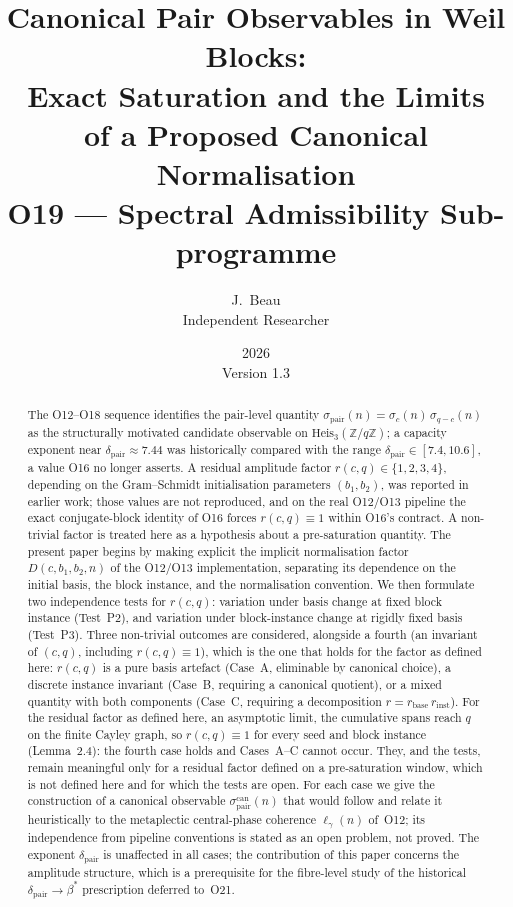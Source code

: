\documentclass[11pt,a4paper]{article}
\title{Canonical Pair Observables in Weil Blocks:\\
Exact Saturation and the Limits\\
of a Proposed Canonical Normalisation\\[6pt]
{\large O19 --- Spectral Admissibility Sub-programme}}
\author{J.~Beau\\[4pt]
\small Independent Researcher}
\date{2026\\Version 1.3}
\theoremstyle{remark}
\newcommand{\bstar}{\beta^{*}}
\newcommand{\dpair}{\delta_{\mathrm{pair}}}
\newcommand{\sigmapair}{\sigma_{\mathrm{pair}}}
\newcommand{\sigmacan}{\sigma_{\mathrm{pair}}^{\mathrm{can}}}
\newcommand{\rcq}{r(c,q)}
\newcommand{\Heis}{\mathrm{Heis}_{3}(\mathbb{Z}/q\mathbb{Z})}
\newcommand{\ellgam}{\ell_{\gamma}}
\begin{document}
  \maketitle

  \begin{abstract}
    The O12--O18 sequence identifies the pair-level quantity
    $\sigmapair(n) = \sigma_{c}(n)\,\sigma_{q-c}(n)$ as the structurally motivated
    candidate observable on $\Heis$; a capacity exponent near
    $\dpair \approx 7.44$ was historically compared with the range
    $\dpair \in [7.4, 10.6]$, a value O16 no longer asserts.
    A residual amplitude factor $\rcq \in \{1,2,3,4\}$, depending on the Gram--Schmidt
    initialisation parameters $(b_{1}, b_{2})$, was reported in earlier work; those values are not
    reproduced, and on the real O12/O13 pipeline the exact conjugate-block identity of O16 forces
    $\rcq \equiv 1$ within O16's contract.
    A non-trivial factor is treated here as a hypothesis about a pre-saturation quantity.
    The present paper begins by making explicit the implicit normalisation factor
    $D(c, b_{1}, b_{2}, n)$ of the O12/O13 implementation, separating its
    dependence on the initial basis, the block instance, and the normalisation
    convention.
    We then formulate two independence tests for $\rcq$: variation under basis
    change at fixed block instance (Test~P2), and variation under block-instance
    change at rigidly fixed basis (Test~P3).
    Three non-trivial outcomes are considered, alongside a fourth (an invariant of $(c,q)$,
    including $\rcq \equiv 1$), which is the one that holds for the factor as defined here: $\rcq$ is a pure basis artefact (Case~A,
    eliminable by canonical choice), a discrete instance invariant (Case~B,
    requiring a canonical quotient), or a mixed quantity with both components
    (Case~C, requiring a decomposition $r = r_{\mathrm{base}}\,r_{\mathrm{inst}}$).
    For the residual factor as defined here, an asymptotic limit, the cumulative spans reach $q$
    on the finite Cayley graph, so $\rcq \equiv 1$ for every seed and block instance
    (Lemma~2.4): the fourth case holds and Cases~A--C cannot occur.
    They, and the tests, remain meaningful only for a residual factor defined on a pre-saturation
    window, which is not defined here and for which the tests are open.
    For each case we give the construction of a canonical observable $\sigmacan(n)$ that would
    follow and relate it heuristically to the metaplectic central-phase coherence $\ellgam(n)$
    of~O12; its independence from pipeline conventions is stated as an open problem, not proved.
    The exponent $\dpair$ is unaffected in all cases; the contribution of this
    paper concerns the amplitude structure, which is a prerequisite for the
    fibre-level study of the historical $\dpair \to \bstar$ prescription deferred to~O21.
  \end{abstract}
\end{document}
